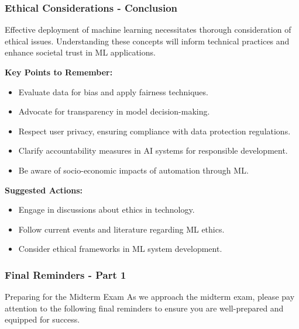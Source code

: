 \documentclass[aspectratio=169]{beamer}
\begin{document}
\begin{frame}[fragile]
    \frametitle{Ethical Considerations - Conclusion}
    Effective deployment of machine learning necessitates thorough consideration of ethical issues. 
    Understanding these concepts will inform technical practices and enhance societal trust in ML applications.

    \textbf{Key Points to Remember:}
    \begin{itemize}
        \item Evaluate data for bias and apply fairness techniques.
        \item Advocate for transparency in model decision-making.
        \item Respect user privacy, ensuring compliance with data protection regulations.
        \item Clarify accountability measures in AI systems for responsible development.
        \item Be aware of socio-economic impacts of automation through ML.
    \end{itemize}

    \textbf{Suggested Actions:}
    \begin{itemize}
        \item Engage in discussions about ethics in technology.
        \item Follow current events and literature regarding ML ethics.
        \item Consider ethical frameworks in ML system development.
    \end{itemize}
\end{frame}

\begin{frame}[fragile]
    \frametitle{Final Reminders - Part 1}
    \begin{block}{Preparing for the Midterm Exam}
        As we approach the midterm exam, please pay attention to the following final reminders to ensure you are well-prepared and equipped for success.
    \end{block}
\end{frame}
\end{document}
